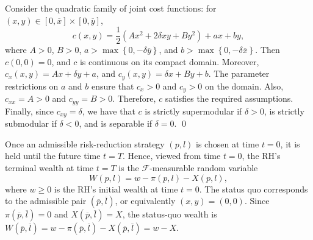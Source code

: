 \documentclass[a4paper,12pt]{article}
\begin{document}
\begin{example}\label{eg:cost_function}
Consider the quadratic family of joint cost functions: for $\left(x,y\right)\in\left[0,\overline{x}\right]\times\left[0,\overline{y}\right]$,
\begin{equation}
c\left(x,y\right)=\frac{1}{2}\left(Ax^2+2\delta xy+By^2\right)+ax+by,
\label{eq:cost_function}
\end{equation}
where $A>0$, $B>0$, $a>\max\left\{0,-\delta\overline{y}\right\}$, and $b>\max\left\{0,-\delta\overline{x}\right\}$. Then $c\left(0,0\right)=0$, and $c$ is continuous on its compact domain. Moreover, $c_x\left(x,y\right)=Ax+\delta y+a$, and $c_y\left(x,y\right)=\delta x+By+b$. The parameter restrictions on $a$ and $b$ ensure that $c_x>0$ and $c_y>0$ on the domain. Also, $c_{xx}=A>0$ and $c_{yy}=B>0$. Therefore, $c$ satisfies the required assumptions. Finally, since $c_{xy}=\delta$, we have that $c$ is strictly supermodular if $\delta>0$, is strictly submodular if $\delta<0$, and is separable if $\delta=0$.
\qed
\end{example}

Once an admissible risk-reduction strategy $\left(p,l\right)$ is chosen at time $t=0$, it is held until the future time $t=T$. Hence, viewed from time $t=0$, the RH's terminal wealth at time $t=T$ is the $\mathcal{F}$-measurable random variable
\begin{equation*}
W\left(p,l\right)=w-\pi\left(p,l\right)-X\left(p,l\right),
\end{equation*}
where $w\geq 0$ is the RH's initial wealth at time $t=0$. The status quo corresponds to the admissible pair $\left(\overline{p},\overline{l}\right)$, or equivalently $\left(x,y\right)=\left(0,0\right)$. Since $\pi\left(\overline{p},\overline{l}\right)=0$ and $X\left(\overline{p},\overline{l}\right)=X$, the status-quo wealth is $W\left(\overline{p},\overline{l}\right)=w-\pi\left(\overline{p},\overline{l}\right)-X\left(\overline{p},\overline{l}\right)=w-X$.
\end{document}
